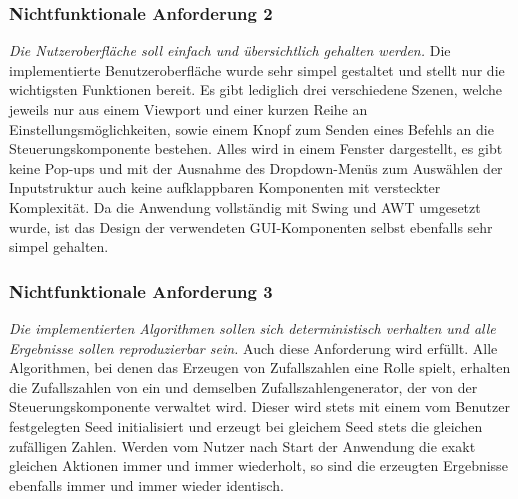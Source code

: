 \subsubsection{Nichtfunktionale Anforderung 2}
\textit{Die Nutzeroberfläche soll einfach und übersichtlich gehalten werden.} Die implementierte Benutzeroberfläche wurde sehr simpel gestaltet und
stellt nur die wichtigsten Funktionen bereit. Es gibt lediglich drei verschiedene Szenen, welche jeweils nur aus einem Viewport und einer kurzen
Reihe an Einstellungsmöglichkeiten, sowie einem Knopf zum Senden eines Befehls an die Steuerungskomponente bestehen. Alles wird in einem Fenster
dargestellt, es gibt keine Pop-ups und mit der Ausnahme des Dropdown-Menüs zum Auswählen der Inputstruktur auch keine aufklappbaren Komponenten mit
versteckter Komplexität. Da die Anwendung vollständig mit Swing und AWT umgesetzt wurde, ist das Design der verwendeten GUI-Komponenten selbst ebenfalls
sehr simpel gehalten.

\subsubsection{Nichtfunktionale Anforderung 3}
\textit{Die implementierten Algorithmen sollen sich deterministisch verhalten und alle Ergebnisse sollen reproduzierbar sein.} Auch diese Anforderung
wird erfüllt. Alle Algorithmen, bei denen das Erzeugen von Zufallszahlen eine Rolle spielt, erhalten die Zufallszahlen von ein und demselben
Zufallszahlengenerator, der von der Steuerungskomponente verwaltet wird. Dieser wird stets mit einem vom Benutzer festgelegten Seed initialisiert und
erzeugt bei gleichem Seed stets die gleichen zufälligen Zahlen. Werden vom Nutzer nach Start der Anwendung die exakt gleichen Aktionen immer und immer
wiederholt, so sind die erzeugten Ergebnisse ebenfalls immer und immer wieder identisch.

